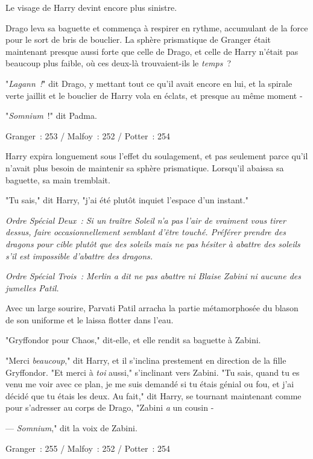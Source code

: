 Le visage de Harry devint encore plus sinistre.

Drago leva sa baguette et commença à respirer en rythme, accumulant de la force pour le sort de bris de bouclier. La sphère prismatique de Granger était maintenant presque aussi forte que celle de Drago, et celle de Harry n'était pas beaucoup plus faible, où ces deux-là trouvaient-ils le \emph{temps}~?

"\emph{Lagann~!}" dit Drago, y mettant tout ce qu'il avait encore en lui, et la spirale verte jaillit et le bouclier de Harry vola en éclats, et presque au même moment -

"\emph{Somnium}~!" dit Padma.

\later

Granger~: 253 / Malfoy~: 252 / Potter~: 254

Harry expira longuement sous l'effet du soulagement, et pas seulement parce qu'il n'avait plus besoin de maintenir sa sphère prismatique. Lorsqu'il abaissa sa baguette, sa main tremblait.

"Tu sais," dit Harry, "j'ai été plutôt inquiet l'espace d'un instant."

\emph{Ordre Spécial Deux~: Si un traître Soleil n'a pas l'air de vraiment vous tirer dessus, faire occasionnellement semblant d'être touché. Préférer prendre des dragons pour cible plutôt que des soleils mais ne pas hésiter à abattre des soleils s'il est impossible d'abattre des dragons.}

\emph{Ordre Spécial Trois~: Merlin a dit ne pas abattre ni Blaise Zabini ni aucune des jumelles Patil.}

Avec un large sourire, Parvati Patil arracha la partie métamorphosée du blason de son uniforme et le laissa flotter dans l'eau.

"Gryffondor pour Chaos," dit-elle, et elle rendit sa baguette à Zabini.

"Merci \emph{beaucoup}," dit Harry, et il s'inclina prestement en direction de la fille Gryffondor. "Et merci à \emph{toi} aussi," s'inclinant vers Zabini. "Tu sais, quand tu es venu me voir avec ce plan, je me suis demandé si tu étais génial ou fou, et j'ai décidé que tu étais les deux. Au fait," dit Harry, se tournant maintenant comme pour s'adresser au corps de Drago, "Zabini \emph{a} un cousin -

--- \emph{Somnium}," dit la voix de Zabini.

\later

Granger~: 255 / Malfoy~: 252 / Potter~: 254

